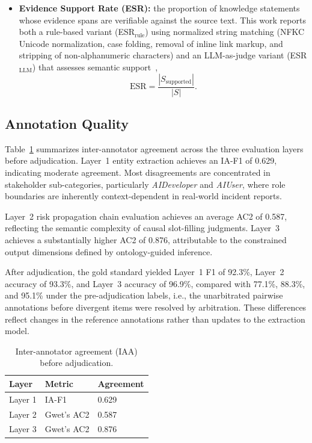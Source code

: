 \documentclass[a4paper,fleqn]{cas-dc}
\begin{document}
\begin{itemize}
  \item \textbf{Evidence Support Rate (ESR):}
        the proportion of knowledge statements whose evidence
        spans are verifiable against the source text.
        This work reports both a rule-based variant (ESR$_{\text{rule}}$)
        using normalized string matching (NFKC Unicode normalization,
        case folding, removal of inline link markup, and stripping of
        non-alphanumeric characters) and an LLM-as-judge
        variant (ESR$_{\text{LLM}}$) that assesses semantic
        support~\cite{zheng2023llmjudge},
        \begin{equation}
          \text{ESR} =
          \frac{|S_{\text{supported}}|}{|S|}.
        \end{equation}

\end{itemize}

\subsection{Annotation Quality}

Table~\ref{tab:iaa} summarizes inter-annotator agreement across the
three evaluation layers before adjudication.
Layer~1 entity extraction achieves an IA-F1 of 0.629, indicating
moderate agreement.
Most disagreements are concentrated in stakeholder sub-categories,
particularly \textit{AIDeveloper} and \textit{AIUser}, where
role boundaries are inherently context-dependent in real-world
incident reports.

Layer~2 risk propagation chain evaluation achieves an average AC2 of
0.587, reflecting the semantic complexity of causal slot-filling
judgments.
Layer~3 achieves a substantially higher AC2 of 0.876, attributable
to the constrained output dimensions defined by ontology-guided
inference.

After adjudication, the gold standard yielded Layer~1 F1 of
92.3\%, Layer~2 accuracy of 93.3\%, and Layer~3 accuracy of 96.9\%,
compared with 77.1\%, 88.3\%, and 95.1\% under the
pre-adjudication labels, i.e., the unarbitrated pairwise
annotations before divergent items were resolved by arbitration.
These differences reflect changes in the
reference annotations rather than updates to the extraction model.

\begin{table}[t]
  \centering
  \caption{Inter-annotator agreement (IAA) before adjudication.}
  \label{tab:iaa}
  \small
  \begin{tabular}{lll}
    \toprule
    \textbf{Layer} & \textbf{Metric} & \textbf{Agreement} \\
    \midrule
    Layer 1 & IA-F1       & 0.629 \\
    Layer 2 & Gwet's AC2  & 0.587 \\
    Layer 3 & Gwet's AC2  & 0.876 \\
    \bottomrule
  \end{tabular}
\end{table}
\end{document}
